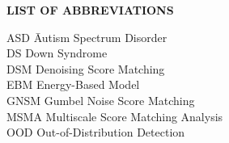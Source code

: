 {}

\begin{center}
{\normalfont \textbf{LIST OF ABBREVIATIONS}}
\end{center}

\newcommand{\Ab}[2]{\noindent  #1 \> #2 \\}
\newcommand{\Abi}[2]{\noindent #1 \hspace{1.5cm} \= #2 \\}

\begin{tabbing}
\Abi{ASD}{Autism Spectrum Disorder}
\Ab{DS}{Down Syndrome}
\Ab{DSM}{Denoising Score Matching}
\Ab{EBM}{Energy-Based Model}
\Ab{GNSM}{Gumbel Noise Score Matching}
\Ab{MSMA}{Multiscale Score Matching Analysis}
\Ab{OOD}{Out-of-Distribution Detection}
\end{tabbing}

\clearpage
